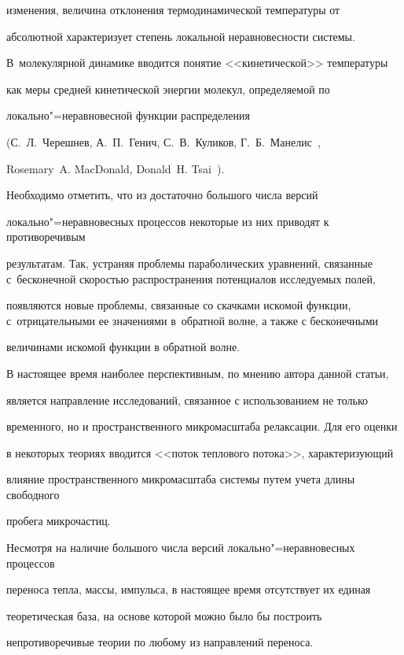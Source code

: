 изменения, величина отклонения термодинамической температуры от

абсолютной характеризует степень локальной неравновесности системы. 

В~молекулярной динамике вводится понятие <<кинетической>> температуры 

как меры средней кинетической энергии молекул, определяемой по

локально"=неравновесной функции распределения 

(С.~Л.~Черешнев, А.~П.~Генич, С.~В.~Куликов, Г.~Б.~Манелис~\cite{kud:bib32},

Rosemary~A. MacDonald,  Donald~H. Tsai~\cite{kud:MacDonald}).



Необходимо отметить, что из достаточно большого числа версий

локально"=неравновесных процессов некоторые из них приводят к противоречивым

результатам. Так, устраняя проблемы параболических уравнений, связанные с~бесконечной скоростью распространения потенциалов исследуемых полей,

появляются новые проблемы, связанные со скачками искомой функции, с~отрицательными ее значениями в~обратной волне, а также с бесконечными

величинами искомой функции в обратной волне.



В настоящее время наиболее перспективным, по мнению автора данной статьи,

является направление исследований, связанное с использованием не только

временного, но и пространственного микромасштаба релаксации. Для его оценки

в некоторых теориях вводится <<поток теплового потока>>, характеризующий

влияние пространственного микромасштаба системы путем учета длины свободного

пробега микрочастиц.



Несмотря на наличие большого числа версий локально"=неравновесных процессов

переноса тепла, массы, импульса, в настоящее время отсутствует их единая

теоретическая база, на основе которой можно было бы построить

непротиворечивые теории по любому из направлений переноса.



